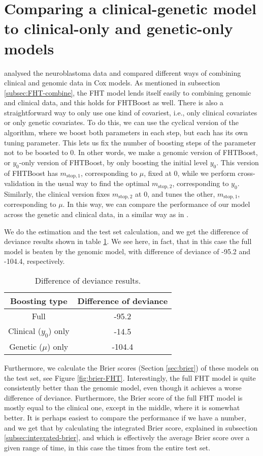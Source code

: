 \section{Comparing a clinical-genetic model to clinical-only and genetic-only models}
\citet{bovelstad2009} analysed the neuroblastoma data and compared different ways of combining clinical and genomic data in Cox models.
As mentioned in subsection \ref{subsec:FHT-combine}, the FHT model lends itself easily to combining genomic and clinical data, and this holds for FHTBoost as well.
There is also a straightforward way to only use one kind of covariest, i.e., only clinical covariates or only genetic covariates.
To do this, we can use the cyclical version of the algorithm, where we boost both parameters in each step, but each has its own tuning parameter.
This lets us fix the number of boosting steps of the parameter not to be boosted to 0.
In other words, we make a genomic version of FHTBoost, or $y_0$-only version of FHTBoost, by only boosting the initial level $y_0$.
This version of FHTBoost has $m_{\text{stop},1}$, corresponding to $\mu$, fixed at 0, while we perform cross-validation in the usual way to find the optimal $m_{\text{stop},2}$, corresponding to $y_0$.
Similarly, the clinical version fixes $m_{\text{stop},2}$ at 0, and tunes the other, $m_{\text{stop},1}$, corresponding to $\mu$.
In this way, we can compare the performance of our model across the genetic and clinical data, in a similar way as in \citet{bovelstad2009}.

We do the estimation and the test set calculation, and we get the difference of deviance results shown in table \ref{tab:deviances}.
We see here, in fact, that in this case the full model is beaten by the genomic model, with difference of deviance of -95.2 and -104.4, respectively.

\begin{table}
\caption{Difference of deviance results.}
\label{tab:deviances}
\centering
\begin{tabular}{cc}
\toprule
Boosting type & Difference of deviance \\
\hline
Full & -95.2 \\
Clinical ($y_0$) only  & -14.5 \\
Genetic ($\mu$) only & -104.4 \\
\bottomrule
\end{tabular}
\end{table}

Furthermore, we calculate the Brier scores (Section \ref{sec:brier}) of these models on the test set, see Figure \ref{fig:brier-FHT}.
Interestingly, the full FHT model is quite consistently better than the genomic model, even though it achieves a worse difference of deviance.
Furthermore, the Brier score of the full FHT model is mostly equal to the clinical one, except in the middle, where it is somewhat better.
It is perhaps easiest to compare the performance if we have a number, and we get that by calculating the integrated Brier score, explained in subsection \ref{subsec:integrated-brier}, and which is effectively the average Brier score over a given range of time, in this case the times from the entire test set.


